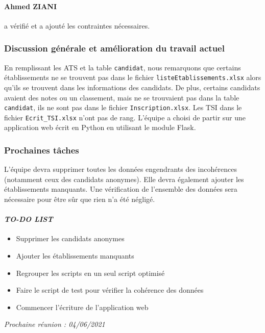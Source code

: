 \paragraph{Ahmed ZIANI} a vérifié et a ajouté les contraintes nécessaires.

\subsubsection*{Discussion générale et amélioration du travail actuel}
En remplissant les ATS et la table \texttt{candidat}, nous remarquons que certains établissements ne se trouvent pas dans le fichier \texttt{listeEtablissements.xlsx} alors qu'ils se trouvent dans les informations des candidats. De plus, certains candidats avaient des notes ou un classement, mais ne se trouvaient pas dans la table \texttt{candidat}, ils ne sont pas dans le fichier \texttt{Inscription.xlsx}. Les TSI dans le fichier \texttt{Ecrit\_TSI.xlsx} n'ont pas de rang. L'équipe a choisi de partir sur une application web écrit en \textsf{Python} en utilisant le module \textsf{Flask}.

\subsubsection*{Prochaines tâches}
L'équipe devra supprimer toutes les données engendrants des incohérences (notamment ceux des candidats anonymes). Elle devra également ajouter les établissements manquants. Une vérification de l'ensemble des données sera nécessaire pour être sûr que rien n'a été négligé.


\paragraph{\emph{TO-DO LIST}}
\begin{itemize}
    \item Supprimer les candidats anonymes
    \item Ajouter les établissements manquants
    \item Regrouper les scripts en un seul script optimisé
    \item Faire le script de test pour vérifier la cohérence des données
    \item Commencer l'écriture de l'application web
    
\end{itemize}

\emph{Prochaine réunion : 04/06/2021}\\

% 
